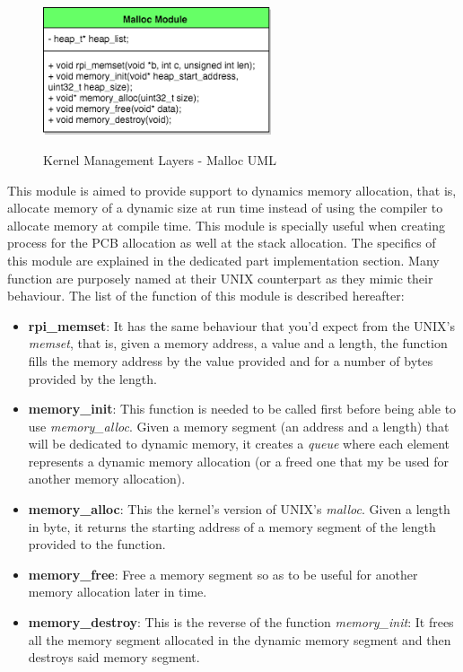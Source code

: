 \begin{figure}[H]
\begin{center}
\includegraphics[width=0.6\textwidth]{includes/figures/chapter5_kernel_management_layer_malloc_UML.png}  \\
\caption{Kernel Management Layers - Malloc UML}
\end{center}
\label{fig:chapter5_kernel_management_layer_malloc_UML}
\end{figure}

This module is aimed to provide support to dynamics memory allocation, that is, allocate memory of a dynamic size at run time instead of using the compiler to allocate memory at compile time. This module is specially useful when creating process for the PCB allocation as well at the stack allocation. The specifics of this module are explained in the dedicated part implementation section.
Many function are purposely named at their UNIX counterpart as they mimic their behaviour. The list of the function of this module is described hereafter:
\begin{itemize}
	\item \textbf{rpi\_memset}: It has the same behaviour that you'd expect from the UNIX's \textit{memset}, that is, given a memory address, a value and a length, the function fills the memory address by the value provided and for a number of bytes provided by the length.
	\item \textbf{memory\_init}: This function is needed to be called first before being able to use \textit{memory\_alloc}. Given a memory segment (an address and a length) that will be dedicated to dynamic memory, it creates a \textit{queue} where each element represents a dynamic memory allocation (or a freed one that my be used for another memory allocation).
	\item \textbf{memory\_alloc}: This the kernel's version of UNIX's \textit{malloc}. Given a length in byte, it returns the starting address of a memory segment of the length provided to the function.
	\item \textbf{memory\_free}: Free a memory segment so as to be useful for another memory allocation later in time.
	\item \textbf{memory\_destroy}: This is the reverse of the function \textit{memory\_init}: It frees all the memory segment allocated in the dynamic memory segment and then destroys said memory segment.
\end{itemize}


